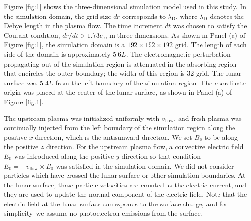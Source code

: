 \documentclass[draft,jgrga]{agutex2015}
\begin{document}
\begin{article}
Figure \ref{fig:1} shows the three-dimensional simulation model used in this study.
In the simulation domain, 
the grid size $dr$ corresponds to $\lambda_\mathrm{D}$, 
where $\lambda_\mathrm{D}$ denotes the Debye length in the plasma flow.
The time increment $dt$ was chosen to satisfy 
the Courant condition, $dr/dt > 1.73 v_\mathrm{c}$, in three dimensions. 
As shown in Panel (a) of Figure \ref{fig:1}, 
the simulation domain is a $192 \times 192 \times 192$ grid. 
The length of each side of the domain is approximately $5.6L$. 
The electromagnetic perturbation propagating out of the simulation region
is attenuated in the absorbing region that encircles the outer boundary; 
the width of this region is 32 grid.
The lunar surface was $5.4L$ 
from the left boundary of the simulation region.
The coordinate origin was placed at the center of the lunar surface, 
as shown in Panel (a) of Figure \ref{fig:1}.

The upstream plasma was initialized uniformly with $v_\mathrm{flow}$,
and fresh plasma was continually injected from the left boundary of 
the simulation region along the positive $x$ direction,
which is the antisunward direction.
We set $B_\mathrm{0}$ to be along the positive $z$ direction.
For the upstream plasma flow, a convective electric field $E_0$ was introduced along the positive $y$ direction 
so that condition $E_\mathrm{0} = -v_\mathrm{flow} \times B_\mathrm{0}$ 
was satisfied in the simulation domain. 
We did not consider particles which have crossed the lunar surface or other simulation boundaries. 
At the lunar surface, these particle velocities are counted as 
the electric current, and they are used to update the normal component
of the electric field. 
Note that the electric field at the lunar surface corresponds to the surface charge,
and for simplicity, we assume no photoelectron emissions from the surface. 


\end{article}
\end{document}
